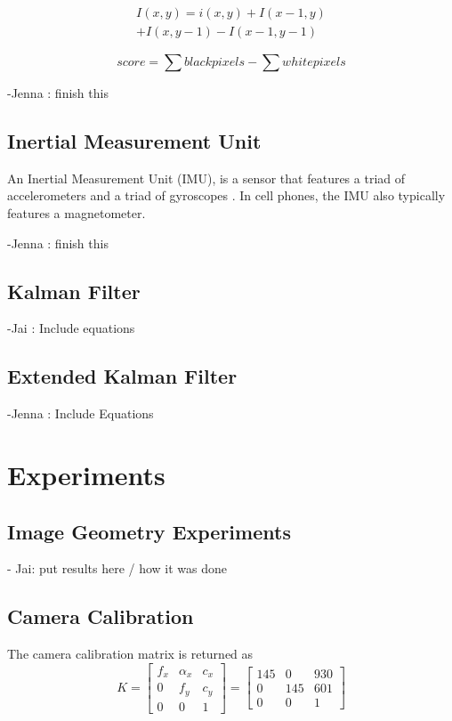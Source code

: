 \documentclass[12pt,twocolumn,letterpaper]{article}
\begin{document}
\begin{multline}
\label{eqn:integral}
I(x,y) =  i(x,y) + I(x-1,y) 
\\+ I(x, y-1) - I(x-1, y-1)
\end{multline}


\textbf{\begin{equation}
\label{eqn:haar}
score = \sum{black pixels} - \sum{white pixels}
\end{equation}}

    -Jenna : finish this
    
\subsection{Inertial Measurement Unit}
An Inertial Measurement Unit (IMU), is a sensor that features a triad of accelerometers and a triad of gyroscopes \cite{Graves}.  In cell phones, the IMU also typically features a magnetometer. 
   
   -Jenna : finish this 
    
\subsection{Kalman Filter}
    -Jai : Include equations
\subsection{Extended Kalman Filter}
    -Jenna : Include Equations
\section{Experiments}
\subsection{Image Geometry Experiments}
 - Jai: put results here / how it was done
\subsection{Camera Calibration}

The camera calibration matrix is returned as
\begin{equation}
K = \begin{bmatrix}
f_x & \alpha_x & c_x\\
0 & f_y &  c_y\\
0 & 0 & 1
\end{bmatrix} = \begin{bmatrix}
145 & 0 & 930\\
 0 &145 & 601\\
0 & 0 & 1
\end{bmatrix}
\end{equation}
\end{document}
